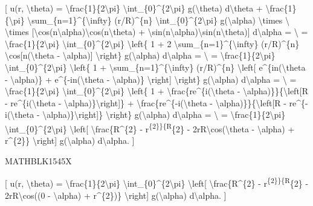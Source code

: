 \documentclass[
]{article}
\begin{document}
{[} u(r, \textbackslash theta) =
\textbackslash frac\{1\}\{2\textbackslash pi\}
\textbackslash int\_\{0\}\^{}\{2\textbackslash pi\}
g(\textbackslash theta) d\textbackslash theta +
\textbackslash frac\{1\}\{\textbackslash pi\}
\textbackslash sum\_\{n=1\}\^{}\{\textbackslash infty\} (r/R)\^{}\{n\}
\textbackslash int\_\{0\}\^{}\{2\textbackslash pi\}
g(\textbackslash alpha) \textbackslash times \textbackslash{}
\textbackslash times
{[}\textbackslash cos(n\textbackslash alpha)\textbackslash cos(n\textbackslash theta)
+
\textbackslash sin(n\textbackslash alpha)\textbackslash sin(n\textbackslash theta){]}
d\textbackslash alpha = \textbackslash{} =
\textbackslash frac\{1\}\{2\textbackslash pi\}
\textbackslash int\_\{0\}\^{}\{2\textbackslash pi\}
\textbackslash left\{ 1 + 2
\textbackslash sum\_\{n=1\}\^{}\{\textbackslash infty\} (r/R)\^{}\{n\}
\textbackslash cos{[}n(\textbackslash theta - \textbackslash alpha){]}
\textbackslash right\} g(\textbackslash alpha) d\textbackslash alpha =
\textbackslash{} = \textbackslash frac\{1\}\{2\textbackslash pi\}
\textbackslash int\_\{0\}\^{}\{2\textbackslash pi\}
\textbackslash left\{ 1 +
\textbackslash sum\_\{n=1\}\^{}\{\textbackslash infty\} (r/R)\^{}\{n\}
\textbackslash left{[} e\^{}\{in(\textbackslash theta -
\textbackslash alpha)\} + e\^{}\{-in(\textbackslash theta -
\textbackslash alpha)\} \textbackslash right{]} \textbackslash right\}
g(\textbackslash alpha) d\textbackslash alpha = \textbackslash{} =
\textbackslash frac\{1\}\{2\textbackslash pi\}
\textbackslash int\_\{0\}\^{}\{2\textbackslash pi\}
\textbackslash left\{ 1 +
\textbackslash frac\{re\^{}\{i(\textbackslash theta -
\textbackslash alpha)\}\}\{\textbackslash left{[}R -
re\^{}\{i(\textbackslash theta -
\textbackslash alpha)\}\textbackslash right{]}\} +
\textbackslash frac\{re\^{}\{-i(\textbackslash theta -
\textbackslash alpha)\}\}\{\textbackslash left{[}R -
re\^{}\{-i(\textbackslash theta -
\textbackslash alpha)\}\textbackslash right{]}\} \textbackslash right\}
g(\textbackslash alpha) d\textbackslash alpha = \textbackslash{} =
\textbackslash frac\{1\}\{2\textbackslash pi\}
\textbackslash int\_\{0\}\^{}\{2\textbackslash pi\}
\textbackslash left{[} \textbackslash frac\{R\^{}\{2\} -
r\textsuperscript{\{2\}\}\{R}\{2\} -
2rR\textbackslash cos(\textbackslash theta - \textbackslash alpha) +
r\^{}\{2\}\} \textbackslash right{]} g(\textbackslash alpha)
d\textbackslash alpha. {]}

MATHBLK1545X

{[} u(r, \textbackslash theta) =
\textbackslash frac\{1\}\{2\textbackslash pi\}
\textbackslash int\_\{0\}\^{}\{2\textbackslash pi\}
\textbackslash left{[} \textbackslash frac\{R\^{}\{2\} -
r\textsuperscript{\{2\}\}\{R}\{2\} - 2rR\textbackslash cos((0 -
\textbackslash alpha) + r\^{}\{2\})\} \textbackslash right{]}
g(\textbackslash alpha) d\textbackslash alpha. {]}
\end{document}
